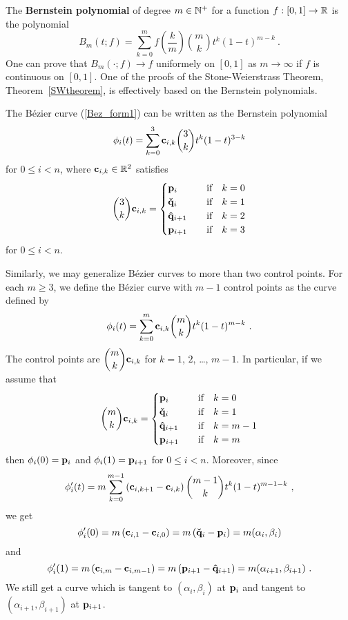 \begin{rmk}
The {\bfseries Bernstein polynomial} of
degree $m \in \mathbb{N}^+$ for a function $f:[0,1]\rightarrow \mathbb{R}$ is the
polynomial
\begin{equation} \label{bernstein1}
B_m(t; f) = \sum_{k=0}^m f\left(\frac{k}{m}\right) \binom{m}{k}
t^k(1-t)^{m-k} \ .
\end{equation}
One can prove that $B_m(\cdot ; f) \rightarrow f$ uniformely on $[0,1]$ as
$m\rightarrow \infty$ if $f$ is continuous on $[0,1]$.  One of the
proofs of the Stone-Weierstrass Theorem, Theorem~\ref{SWtheorem}, is
effectively based on the Bernstein polynomials.

The Bézier curve (\ref{Bez_form1}) can be written as the Bernstein
polynomial
\[
\phi_i(t) = \sum_{k=0}^3 \mathbf{c}_{i,k} \binom{3}{k} t^k(1-t)^{3-k}
\]
for $0 \leq i < n$, where $\mathbf{c}_{i,k} \in \mathbb{R}^2$ satisfies
\[
\binom{3}{k} \mathbf{c}_{i,k} =
\begin{cases}
\mathbf{p}_i & \quad \text{if} \quad k = 0 \\
\mathbf{\check{q}}_i & \quad \text{if} \quad k = 1 \\
\mathbf{\hat{q}}_{i+1} & \quad \text{if} \quad k = 2 \\
\mathbf{p}_{i+1} & \quad \text{if} \quad k = 3
\end{cases}
\]
for $0 \leq i < n$.

Similarly, we may generalize Bézier curves to more
than two control points.  For each $m \geq 3$, we define the Bézier
curve with $m-1$ control points as the curve defined by
\begin{equation} \label{bernstein2}
\phi_i(t) = \sum_{k=0}^m \VEC{c}_{i,k} \binom{m}{k} t^k(1-t)^{m-k} \ .
\end{equation}
The control points are
$\displaystyle \binom{m}{k} \mathbf{c}_{i,k}$ for $k=1$, $2$,
\ldots, $m-1$.  In particular, if we assume that
\[
\binom{m}{k} \mathbf{c}_{i,k} =
\begin{cases}
\mathbf{p}_i & \quad \text{if} \quad k = 0 \\
\mathbf{\check{q}}_i & \quad \text{if} \quad k = 1 \\
\mathbf{\hat{q}}_{i+1} & \quad \text{if} \quad k = m-1 \\
\mathbf{p}_{i+1} & \quad \text{if} \quad k = m
\end{cases}
\]
then $\phi_i(0) = \mathbf{p}_i$ and
$\phi_i(1) = \mathbf{p}_{i+1}$ for $0\leq i < n$.  Moreover, since
\[
\phi_i'(t) = m
\sum_{k=0}^{m-1} \left( \mathbf{c}_{i,k+1} - \mathbf{c}_{i,k} \right)
\binom{m-1}{k} t^k(1-t)^{m-1-k} \ ,
\]
we get
\[
  \phi_i'(0) = m\left( \mathbf{c}_{i,1} - \mathbf{c}_{i,0} \right)
  = m\left(\mathbf{\check{q}}_i - \mathbf{p}_i\right) = m (\alpha_i , \beta_i )
\]
and
\[
\phi_i'(1) = m\left( \mathbf{c}_{i,m} - \mathbf{c}_{i,m-1} \right)
= m\left(\mathbf{p}_{i+1} - \mathbf{\hat{q}}_{i+1}\right)
= m (\alpha_{i+1} , \beta_{i+1} ) \ .
\]
We still get a curve which is tangent to $(\alpha_i,\beta_i)$ at
$\mathbf{p}_i$ and tangent to $(\alpha_{i+1},\beta_{i+1})$ at
$\mathbf{p}_{i+1}$.
\end{rmk}

